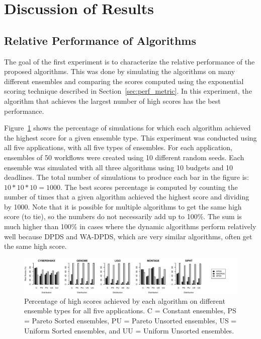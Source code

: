 \documentclass[conference]{IEEEtran}
\begin{document}
\section{Discussion of Results}
\label{sec:results}



\subsection{Relative Performance of Algorithms}

The goal of the first experiment is to characterize the relative performance of the proposed algorithms. This was done by simulating the algorithms on many different ensembles and comparing the scores computed using the exponential scoring technique described in Section~\ref{sec:perf_metric}. In this experiment, the algorithm that achieves the largest number of high scores has the best performance.

Figure~\ref{fig:distributions} shows the percentage of simulations for which each algorithm achieved the highest score for a given ensemble type. This experiment was conducted using all five applications, with all five types of ensembles. For each application, ensembles of 50 workflows were created using 10 different random seeds. Each ensemble was simulated with all three algorithms using 10 budgets and 10 deadlines. The total number of simulations to produce each bar in the figure is: $10 * 10 * 10 = 1000$. The best scores percentage is computed by counting the number of times that a given algorithm achieved the highest score and dividing by 1000. Note that it is possible for multiple algorithms to get the same high score (to tie), so the numbers do not necessarily add up to 100\%. The sum is much higher than 100\% in cases where the dynamic algorithms perform relatively well because DPDS and WA-DPDS, which are very similar algorithms, often get the same high score.

\begin{figure}[ht]
    \centering
    \includegraphics[width=1.06\textwidth]{run-finish-variations-test-0-output-distributions}
    \caption[Percentage of high scores achieved by each algorithm on different ensemble types for all five applications.]{Percentage of high scores achieved by each algorithm on different ensemble types for all five applications. C = Constant ensembles, PS = Pareto Sorted ensembles, PU = Pareto Unsorted ensembles, US = Uniform Sorted ensembles, and UU = Uniform Unsorted ensembles.}
    \label{fig:distributions}
\end{figure}
\end{document}
